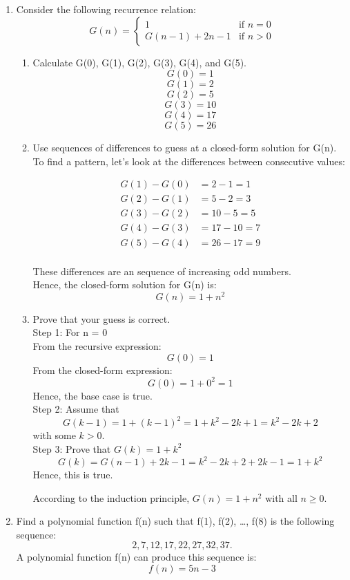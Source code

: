 \documentclass[12pt]{article}
\begin{document}
\begin{enumerate}
    \item Consider the following recurrence relation:
    \[
    G(n) = 
    \begin{cases}
    1 & \text{if } n = 0 \\
    G(n-1) + 2n - 1& \text{if } n > 0
    \end{cases}
    \] 
    \begin{enumerate}
        \item Calculate G(0), G(1), G(2), G(3), G(4), and G(5).
        \[G(0) = 1\]
        \[G(1) = 2\]
        \[G(2) = 5\]
        \[G(3) = 10\]
        \[G(4) = 17\]
        \[G(5) = 26\]
        \item Use sequences of differences to guess at a closed-form solution for G(n).\\
        To find a pattern, let's look at the differences between consecutive values:

        \[
        \begin{aligned}
            G(1) - G(0) &= 2 - 1 = 1 \\
            G(2) - G(1) &= 5 - 2 = 3 \\
            G(3) - G(2) &= 10 - 5 = 5 \\
            G(4) - G(3) &= 17 - 10 = 7 \\
            G(5) - G(4) &= 26 - 17 = 9 \\
        \end{aligned}
        \]

        These differences are an sequence of increasing odd numbers.\\
        Hence, the closed-form solution for G(n) is:
        \[G(n) = 1 + n^2\]
        \item Prove that your guess is correct.\\
        Step 1: For n = 0\\
        From the recursive expression:
        \[G(0) = 1\]
        From the closed-form expression:
        \[G(0) = 1 + 0^2 = 1\]
        Hence, the base case is true.\\
        Step 2: Assume that
        \[G(k-1) = 1 + (k-1)^2 = 1 + k^2 - 2k + 1 = k^2 - 2k + 2\]
        with some $k > 0$.\\
        Step 3: Prove that $G(k) = 1 + k^2$
        \[G(k) = G(n-1) + 2k - 1 = k^2 - 2k + 2 + 2k - 1 = 1 + k^2\]
        Hence, this is true.

        According to the induction principle, $G(n) = 1 + n^2$ with all $n \geq 0$.
    \end{enumerate}
    
    \item Find a polynomial function f(n) such that f(1), f(2), …, f(8) is the following sequence:
    \[2, 7, 12, 17, 22, 27, 32, 37.\]
    A polynomial function f(n) can produce this sequence is:
    \[f(n) = 5n - 3\]
\end{enumerate}
\end{document}
